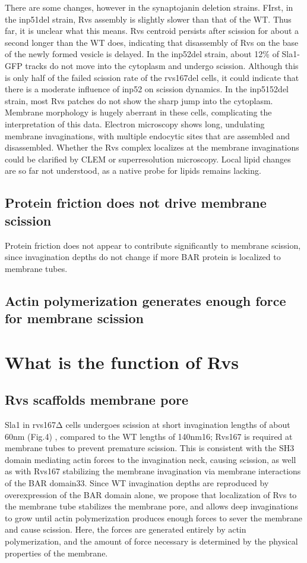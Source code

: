 There are some changes, however in the synaptojanin deletion strains. FIrst, in the inp51del strain, Rvs assembly is slightly slower than that of the WT. Thus far, it is unclear what this means. Rvs centroid persists after scission for about a second longer than the WT does, indicating that disassembly of Rvs on the base of the newly formed vesicle is delayed. In the inp52del strain, about 12\% of Sla1-GFP tracks do not move into the cytoplasm and undergo scission. Although this is only half of the failed scission rate of the rvs167del cells, it could indicate that there is a moderate influence of inp52 on scission dynamics. In the inp5152del strain, most Rvs patches do not show the sharp jump into the cytoplasm. Membrane morphology is hugely aberrant in these cells, complicating the interpretation of this data. Electron microscopy shows long, undulating membrane invaginations, with multiple endocytic sites that are assembled and disassembled. Whether the Rvs complex localizes at the membrane invaginations could be clarified by CLEM or superresolution microscopy. Local lipid changes are so far not understood, as a native probe for lipids remains lacking. 



\subsection{Protein friction does not drive membrane scission}
Protein friction does not appear to contribute significantly to membrane scission, since invagination depths do not change if more BAR protein is localized to membrane tubes.

\subsection{ Actin polymerization generates enough force for membrane scission}

\section{What is the function of Rvs}
\subsection{Rvs scaffolds membrane pore}
Sla1 in rvs167Δ cells undergoes scission at short invagination lengths of about 60nm (Fig.4) , compared to the WT lengths of 140nm16; Rvs167 is required at membrane tubes to prevent premature scission. This is consistent with the SH3 domain mediating actin forces to the invagination neck, causing scission, as well as with Rvs167 stabilizing the membrane invagination via membrane interactions of the BAR domain33. Since WT invagination depths are reproduced by overexpression of the BAR domain alone, we propose that localization of Rvs to the membrane tube stabilizes the membrane pore, and allows deep invaginations to grow until actin polymerization produces enough forces to sever the membrane and cause scission. Here, the forces are generated entirely by actin polymerization, and the amount of force necessary is determined by the physical properties of the membrane.

